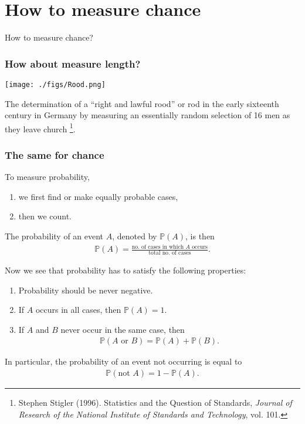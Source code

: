 \documentclass[9pt]{beamer}
\begin{document}
\section{How to measure chance}%
\begin{frame}[fragile] %
 \begin{center}
  \huge
  How to measure chance?
 \end{center}
\end{frame}
\begin{frame}[fragile,t] %
  \frametitle{How about measure length?}
  \begin{center}
    \texttt{[image: ./figs/Rood.png]}
    \bigskip

    The determination of a ``right and lawful rood'' or rod in the early sixteenth century in
    Germany by measuring an essentially random selection of 16 men as they leave church
    \footnote{Stephen Stigler (1996). Statistics and the Question of Standards, {\em Journal of Research of
    the National Institute of Standards and Technology}, vol. 101.}.
  \end{center}
\end{frame}
\begin{frame}[fragile] %
  \frametitle{The same for chance}

  To measure probability, \pause
  \begin{enumerate}
    \item we first find or make equally probable cases,
    \item then we count.
  \end{enumerate}
  \bigskip \vfill \pause

  The probability of an event $A$, denoted by $\mathbb{P}(A)$, is then
  \begin{align*}
    \mathbb{P}(A) = \frac{\text{no. of cases in which $A$ occurs}}{\text{total no. of cases}}.
  \end{align*}

\end{frame}
\begin{frame}[fragile,t] %
 Now we see that probability has to satisfy the following properties: \pause

 \begin{enumerate}
   \item Probability should be never negative.
   \item If $A$ occurs in all cases, then  $ \mathbb{P}(A)=1$.
   \item If $A$ and $B$ never occur in the same case, then
     \begin{align*}
       \mathbb{P}\left(\text{$A$ or  $B$}\right) = \mathbb{P}(A) + \mathbb{P}(B).
     \end{align*}
 \end{enumerate}
 \vfill \pause

 In particular, the probability of an event not occurring is equal to
 \begin{align*}
   \mathbb{P}(\text{not $A$})  = 1 - \mathbb{P}(A).
 \end{align*}

\end{frame}
\end{document}
